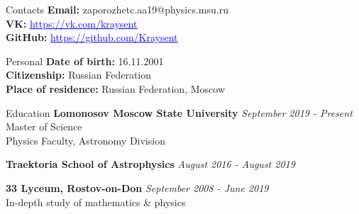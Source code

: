 \documentclass{resume} %
\newcommand{\link}[2]{\href{#1}{\textcolor{blue}{\underline{#2}}}}
\begin{document}
	\begin{rSection}{Contacts}
		\textbf{Email: } zaporozhetc.aa19@physics.msu.ru
		\\ \textbf{VK: } \link{https://vk.com/kraysent}{https://vk.com/kraysent}
		\\ \textbf{GitHub: } \link{https://github.com/Kraysent}{https://github.com/Kraysent}
	\end{rSection}		

	\begin{rSection}{Personal}
		\textbf{Date of birth:} 16.11.2001
		\\ \textbf{Citizenship:} Russian Federation
		\\ \textbf{Place of residence:} Russian Federation, Moscow
	\end{rSection}

	\begin{rSection}{Education}
		\textbf{Lomonosov Moscow State University} \hfill \textit{September 2019 - Present}
		\\ Master of Science
		\\ Physics Faculty, Astronomy Division

		\textbf{Traektoria School of Astrophysics} \hfill \textit{August 2016 - August 2019}

		\textbf{33 Lyceum, Rostov-on-Don} \hfill \textit{September 2008 - June 2019}
		\\ In-depth study of mathematics \& physics
	\end{rSection}
	
\end{document}

